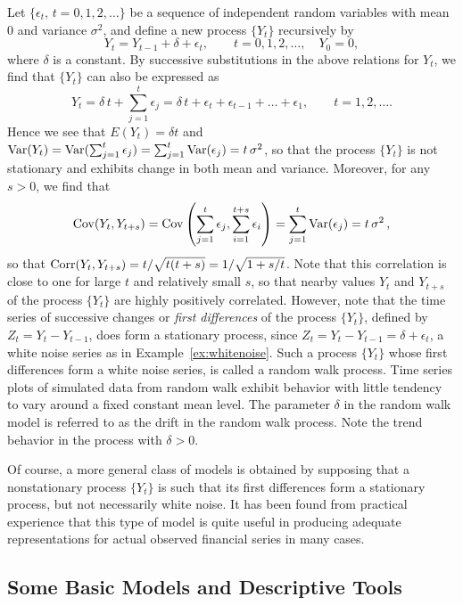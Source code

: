 \begin{ex} \label{ex:driftwalk} Let $\{\epsilon_t, \, t=0,1,2, \ldots\}$ be a sequence of independent random variables with mean 0 and variance $\sigma^2$, and define a new process $\{Y_t\}$ recursively by
	\[
	Y_t = Y_{t-1} + \delta + \epsilon_t, \qquad t=0,1,2, \ldots, \quad Y_0 = 0,
	\]
where $\delta$ is a constant.  By successive substitutions in the above relations for $Y_t$, we find that $\{Y_t\}$ can also be expressed as
	\[
	Y_t = \delta \, t + \sum_{j=1}^t \epsilon_j= \delta \, t + \epsilon_{t} + \epsilon_{t-1} + \ldots + \epsilon_{1}, \qquad t=1,2, \ldots .
	\]
Hence we see that $E(Y_t)=\delta t$ and $\operatorname{Var}(Y_t)= \operatorname{Var}(\sum_{j=1}^t \epsilon_j)= \sum_{j=1}^t\operatorname{Var}(\epsilon_j)=t \, \sigma^2$, so that the process $\{Y_t\}$ is not stationary and exhibits change in both mean and variance.  Moreover, for any $s>0$, we find that
	\[
	\operatorname{Cov}(Y_t,Y_{t+s})= \operatorname{Cov}\left(\sum_{j=1}^t \epsilon_j, \sum_{i=1}^{t+s} \epsilon_i\right)= \sum_{j=1}^t\text{Var}(\epsilon_j)= t \, \sigma^2 \, ,
	\]
so that $\operatorname{Corr}(Y_t,Y_{t+s}) = t / \sqrt{t(t+s)} = 1/ \sqrt{1+s/t}$. Note that this correlation is close to one for large $t$ and relatively small $s$, so that nearby values $Y_t$ and $Y_{t+s}$ of the process $\{Y_t\}$ are highly positively correlated.  However, note that the time series of successive changes or \textit{first differences} of the process $\{Y_t\}$, defined by $Z_{t}=Y_{t}-Y_{t-1}$, does form a stationary process, since $Z_{t}=Y_{t}-Y_{t-1} = \delta + \epsilon_t$, a white noise series as in Example~\ref{ex:whitenoise}. Such a process $\{Y_t\}$ whose first differences form a white noise series, is called a random walk process. Time series plots of simulated data from random walk exhibit behavior with little tendency to vary around a fixed constant mean level. The parameter $\delta$ in the random walk model is referred to as the drift in the random walk process. Note the trend behavior in the process with $\delta>0$.
\end{ex}


Of course, a more general class of models is obtained by supposing that a nonstationary process $\{Y_t\}$ is such that its first differences form a stationary process, but not necessarily white noise.  It has been found from practical experience that this type of model is quite useful in producing adequate representations for actual observed financial series in many cases.


\subsection{Some Basic Models and Descriptive Tools} \hfill


